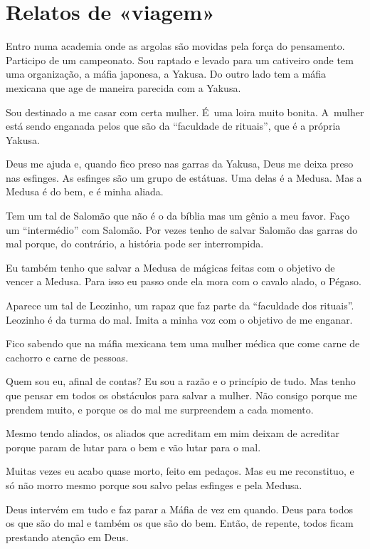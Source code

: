  

\section{Relatos de «viagem»}

Entro numa academia onde as argolas são movidas pela força do
pensamento. Participo de um campeonato. Sou raptado e levado para um
cativeiro onde tem uma organização, a máfia japonesa, a Yakusa. Do outro
lado tem a máfia mexicana que age de maneira parecida com a Yakusa.

Sou destinado a me casar com certa mulher. É~uma loira muito bonita. A~mulher está sendo enganada pelos que são da ``faculdade de rituais'',
que é a própria Yakusa.

Deus me ajuda e, quando fico preso nas garras da Yakusa, Deus me deixa
preso nas esfinges. As esfinges são um grupo de estátuas. Uma delas é a
Medusa. Mas a Medusa é do bem, e é minha aliada.

Tem um tal de Salomão que não é o da bíblia mas um gênio a meu favor.
Faço um ``intermédio'' com Salomão. Por vezes tenho de salvar Salomão
das garras do mal porque, do contrário, a história pode ser interrompida.

Eu também tenho que salvar a Medusa de mágicas feitas com o objetivo de
vencer a Medusa. Para isso eu passo onde ela mora com o cavalo alado, o
Pégaso.

Aparece um tal de Leozinho, um rapaz que faz parte da ``faculdade dos
rituais''. Leozinho é da turma do mal. Imita a minha voz com o objetivo
de me enganar.

Fico sabendo que na máfia mexicana tem uma mulher médica que come carne
de cachorro e carne de pessoas.

Quem sou eu, afinal de contas? Eu sou a razão e o princípio de tudo. Mas
tenho que pensar em todos os obstáculos para salvar a mulher. Não
consigo porque me prendem muito, e porque os do mal me surpreendem a
cada momento.

Mesmo tendo aliados, os aliados que acreditam em mim deixam de acreditar
porque param de lutar para o bem e vão lutar para o mal.

Muitas vezes eu acabo quase morto, feito em pedaços. Mas eu me
reconstituo, e só não morro mesmo porque sou salvo pelas esfinges e pela
Medusa.

Deus intervém em tudo e faz parar a Máfia de vez em quando. Deus para
todos os que são do mal e também os que são do bem. Então, de repente,
todos ficam prestando atenção em Deus.

